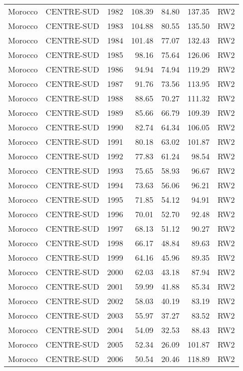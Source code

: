 \begin{longtable}{lllrrrl}
  Morocco & CENTRE-SUD & 1982 & 108.39 & 84.80 & 137.35 & RW2 \\ 
  Morocco & CENTRE-SUD & 1983 & 104.88 & 80.55 & 135.50 & RW2 \\ 
  Morocco & CENTRE-SUD & 1984 & 101.48 & 77.07 & 132.43 & RW2 \\ 
  Morocco & CENTRE-SUD & 1985 & 98.16 & 75.64 & 126.06 & RW2 \\ 
  Morocco & CENTRE-SUD & 1986 & 94.94 & 74.94 & 119.29 & RW2 \\ 
  Morocco & CENTRE-SUD & 1987 & 91.76 & 73.56 & 113.95 & RW2 \\ 
  Morocco & CENTRE-SUD & 1988 & 88.65 & 70.27 & 111.32 & RW2 \\ 
  Morocco & CENTRE-SUD & 1989 & 85.66 & 66.79 & 109.39 & RW2 \\ 
  Morocco & CENTRE-SUD & 1990 & 82.74 & 64.34 & 106.05 & RW2 \\ 
  Morocco & CENTRE-SUD & 1991 & 80.18 & 63.02 & 101.87 & RW2 \\ 
  Morocco & CENTRE-SUD & 1992 & 77.83 & 61.24 & 98.54 & RW2 \\ 
  Morocco & CENTRE-SUD & 1993 & 75.65 & 58.93 & 96.67 & RW2 \\ 
  Morocco & CENTRE-SUD & 1994 & 73.63 & 56.06 & 96.21 & RW2 \\ 
  Morocco & CENTRE-SUD & 1995 & 71.85 & 54.12 & 94.91 & RW2 \\ 
  Morocco & CENTRE-SUD & 1996 & 70.01 & 52.70 & 92.48 & RW2 \\ 
  Morocco & CENTRE-SUD & 1997 & 68.13 & 51.12 & 90.27 & RW2 \\ 
  Morocco & CENTRE-SUD & 1998 & 66.17 & 48.84 & 89.63 & RW2 \\ 
  Morocco & CENTRE-SUD & 1999 & 64.16 & 45.96 & 89.35 & RW2 \\ 
  Morocco & CENTRE-SUD & 2000 & 62.03 & 43.18 & 87.94 & RW2 \\ 
  Morocco & CENTRE-SUD & 2001 & 59.99 & 41.88 & 85.34 & RW2 \\ 
  Morocco & CENTRE-SUD & 2002 & 58.03 & 40.19 & 83.19 & RW2 \\ 
  Morocco & CENTRE-SUD & 2003 & 55.97 & 37.27 & 83.52 & RW2 \\ 
  Morocco & CENTRE-SUD & 2004 & 54.09 & 32.53 & 88.43 & RW2 \\ 
  Morocco & CENTRE-SUD & 2005 & 52.34 & 26.09 & 101.87 & RW2 \\ 
  Morocco & CENTRE-SUD & 2006 & 50.54 & 20.46 & 118.89 & RW2 \\ 

\end{longtable}
